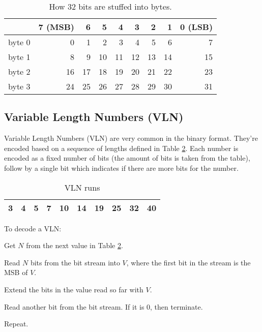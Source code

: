 \begin{table}[H]
    \centering
    \caption{How 32 bits are stuffed into bytes.}
    \label{tab:bitorder}
    \begin{tabular}{|r|r|r|r|r|r|r|r|r|}
        \hline
        & 7 (MSB) & 6 & 5 & 4 & 3 & 2 & 1 & 0 (LSB) \\
        \hline
        byte 0 & 0 & 1 & 2 & 3 & 4 & 5 & 6 & 7 \\
        byte 1 & 8 & 9 & 10 & 11 & 12 & 13 & 14 & 15 \\
        byte 2 & 16 & 17 & 18 & 19 & 20 & 21 & 22 & 23 \\
        byte 3 & 24 & 25 & 26 & 27 & 28 & 29 & 30 & 31 \\
        \hline
    \end{tabular}
\end{table}

\subsection{Variable Length Numbers (VLN)}

Variable Length Numbers (VLN) are very common in the binary format. They're
encoded based on a sequence of lengths defined in Table \ref{tab:vln}. Each
number is encoded as a fixed number of bits (the amount of bits is taken from
the table), follow by a single bit which indicates if there are more bits for
the number.

\begin{table}[H]
    \centering
    \caption{VLN runs}
    \label{tab:vln}
    \begin{tabular}{|r|r|r|r|r|r|r|r|r|r|}
        \hline
        3 & 4 & 5 & 7 & 10 & 14 & 19 & 25 & 32 & 40 \\
        \hline
    \end{tabular}
\end{table}

\begin{steps}{To decode a VLN:}
    \item Get $N$ from the next value in Table \ref{tab:vln}.
    \item Read $N$ bits from the bit stream into $V$, where the first bit in
        the stream is the MSB of $V$.
    \item Extend the bits in the value read so far with $V$.
    \item Read another bit from the bit stream. If it is 0, then terminate.
    \item Repeat.
\end{steps}


